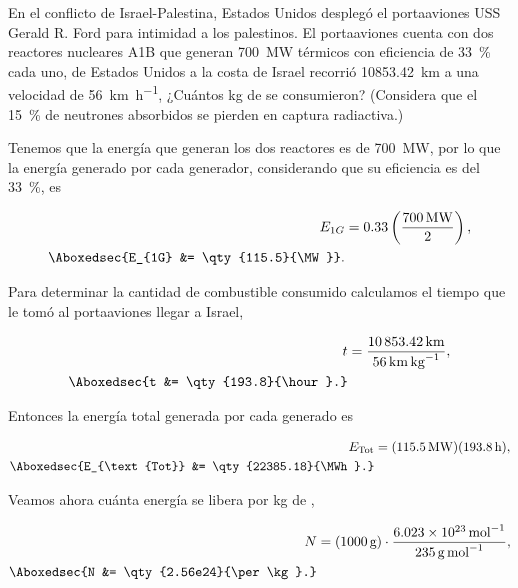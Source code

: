 \documentclass[./../main.tex]{subfiles}
\begin{document}
    \begin{exercise}
        En el conflicto de Israel-Palestina, Estados Unidos desplegó el portaaviones USS Gerald R. Ford para intimidad a los palestinos. El portaaviones cuenta con dos reactores nucleares A1B que generan \qty{700}{\MW} térmicos con eficiencia de \qty{33}{\percent} cada uno, de Estados Unidos a la costa de Israel recorrió \qty{10853.42}{\km} a una velocidad de \qty{56}{\km\per\hour}, ¿Cuántos \unit{\kg} de  se consumieron? (Considera que el \qty{15}{\percent} de neutrones absorbidos se pierden en captura radiactiva.)

        \begin{solution}
            Tenemos que la energía que generan los dos reactores es de \qty{700}{\MW}, por lo que la energía generado por cada generador, considerando que su eficiencia es del \qty{33}{\percent}, es 

            \begin{align*}
                E_{1G} &= 0.33\left(\dfrac{\qty{700}{\MW}}{2}\right),\\
                \Aboxedsec{E_{1G} &= \qty{115.5}{\MW}}.
            \end{align*}

            Para determinar la cantidad de combustible consumido calculamos el tiempo que le tomó al portaaviones llegar a Israel,

            \begin{align*}
                t &= \dfrac{\qty{10853.42}{\km}}{\qty{56}{\km\per\kg}},\\
                \Aboxedsec{t &= \qty{193.8}{\hour}.}
            \end{align*}

            Entonces la energía total generada por cada generado es

            \begin{align*}
                E_{\text{Tot}} &= (\qty{115.5}{\MW})(\qty{193.8}{\hour}),\\
                \Aboxedsec{E_{\text{Tot}} &= \qty{22385.18}{\MWh}.}
            \end{align*}

            Veamos ahora cuánta energía se libera por \unit{\kg} de ,

            \begin{align*}
                N &= (\qty{1000}{\g})\cdot\dfrac{\qty[per-mode=power]{6.023e23}{\per\mol}}{\qty{235}{\g\per\mol}},\\
                \Aboxedsec{N &= \qty{2.56e24}{\per\kg}.}
            \end{align*}


\end{solution}
\end{exercise}
\end{document}
